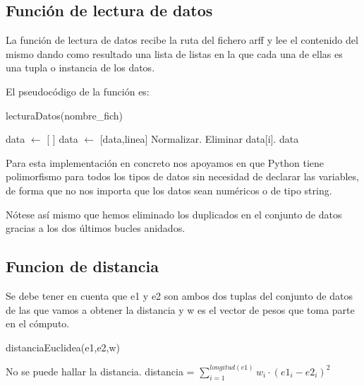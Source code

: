 \documentclass[12pt,a4paper]{article}
\begin{document}
	\subsection{Función de lectura de datos}
	
	La función de lectura de datos recibe la ruta del fichero arff y lee el contenido del mismo dando como resultado una lista de listas en la que cada una de ellas es una tupla o instancia de los datos.
	
	El pseudocódigo de la función es:
	
	\begin{algorithm}[!h]
		\caption{lecturaDatos(nombre\_fich)}
		\label{algoritmoLecturaDatos}
		\begin{algorithmic}
			\STATE data $\leftarrow$ [ ]
					\STATE data $\leftarrow$ [data,linea]
				\ENDIF
			\ENDFOR
					\STATE Normalizar.
				\ENDFOR
			\ENDFOR
						\STATE Eliminar data[i].
					\ENDIF
				\ENDFOR
			\ENDFOR
			\RETURN data
		\end{algorithmic}
	\end{algorithm}
	
	Para esta implementación en concreto nos apoyamos en que Python tiene polimorfismo para todos los tipos de datos sin necesidad de declarar las variables, de forma que no nos importa que los datos sean numéricos o de tipo string.
	
	Nótese así mismo que hemos eliminado los duplicados en el conjunto de datos gracias a los dos últimos bucles anidados.
	
	\subsection{Funcion de distancia}
	
	Se debe tener en cuenta que e1 y e2 son ambos dos tuplas del conjunto de datos de las que vamos a obtener la distancia y w es el vector de pesos que toma parte en el cómputo.
	
	\begin{algorithm}[!h]
		\caption{distanciaEuclidea(e1,e2,w)}
		\begin{algorithmic}
			\IF{longitud(e1)!=longitud(e2)}
			\STATE No se puede hallar la distancia.
			\ELSE
			\STATE distancia = $\sum_{i=1}^{longitud(e1)}w_i\cdot (e1_i - e2_i)^2$
			\ENDIF
		\end{algorithmic}
	\end{algorithm}
	
\end{document}
